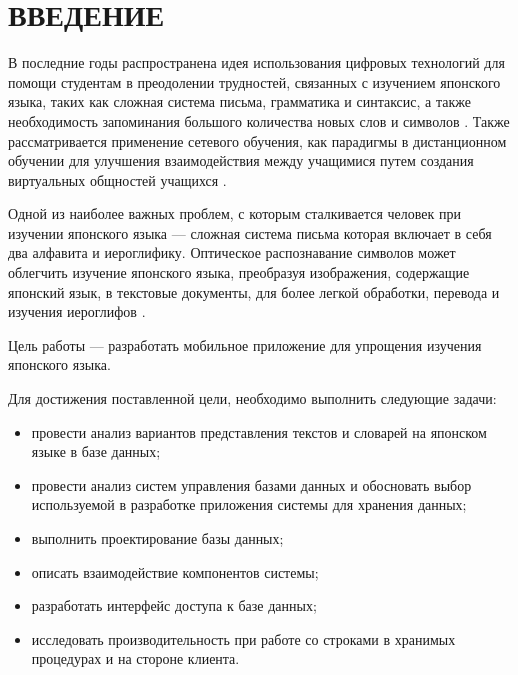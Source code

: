 \chapter*{ВВЕДЕНИЕ}

В последние годы распространена идея использования цифровых
технологий для помощи студентам в преодолении трудностей,
связанных с изучением японского языка, таких как сложная система
письма, грамматика и синтаксис, а также необходимость запоминания
большого количества новых слов и символов \cite{muhtarova}.
Также рассматривается применение сетевого обучения, как парадигмы в
дистанционном обучении для улучшения взаимодействия между
учащимися путем создания виртуальных общностей учащихся \cite{edu-network}.

Одной из наиболее важных проблем, с которым сталкивается человек
при изучении японского языка --- сложная система письма которая
включает в себя два алфавита и иероглифику. Оптическое распознавание
символов может облегчить изучение японского языка, преобразуя
изображения, содержащие японский язык, в текстовые документы,
для более легкой обработки, перевода и изучения иероглифов \cite{ocr-usage}.

Цель работы --- разработать мобильное приложение для упрощения
изучения японского языка.

Для достижения поставленной цели, необходимо выполнить следующие
задачи:

\begin{itemize}
  \item провести анализ вариантов представления текстов и словарей
    на японском языке в базе данных;
  \item провести анализ систем управления базами данных и обосновать
    выбор используемой в разработке приложения системы для хранения данных;
  \item выполнить проектирование базы данных;
  \item описать взаимодействие компонентов системы;
  \item разработать интерфейс доступа к базе данных;
  \item исследовать производительность при работе со строками в
    хранимых процедурах и на стороне клиента.
\end{itemize}

